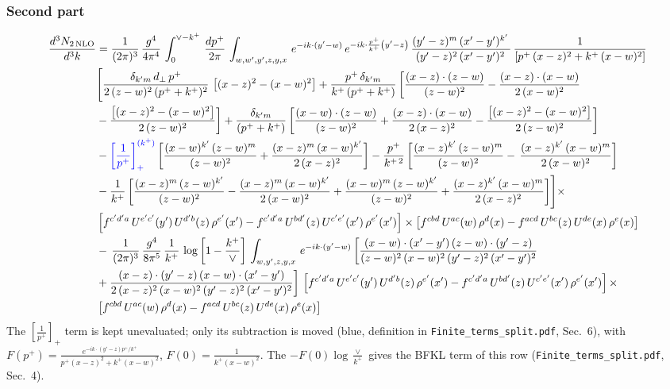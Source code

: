 \documentclass[9pt]{article}
\newcommand{\new}[1]{{\color{blue}#1}}
\numberwithin{equation}{section}
\begin{document}
\subsubsection{Second part}
\begin{align}
 \frac{d^{3}N_{2\,\rm NLO}}{d^{3}k} & = \frac{1}{(2\pi)^{3}}\,\frac{g^{4}}{4\pi^{4}}\,\int_{0}^{\vee-k^{+}}\, \frac{dp^{+}}{2\pi}\,\int_{w,w',y',z,y,x}\, e^{-ik\cdot (y'-w)}\,e^{-ik\cdot \frac{p^{+}}{k^{+}}\left(y'-z\right)}\, \frac{(y'-z)^{m}\,(x'-y')^{k'}\,}{(y'-z)^{2}\,(x'-y')^{2}\,}\, \frac{1}{\left[p^{+}\,(x-z)^{2}+k^{+}\,(x-w)^{2}\right]}\notag \\ & \Bigg[\frac{\delta_{k'm}\,d_{\perp}\,p^{+}}{2\,(z-w)^{2}\,(p^{+}+k^{+})^{2}}\, \left[(x-z)^{2}-(x-w)^{2}\right]+\frac{p^{+}\,\delta_{k'm}}{k^{+}\,(p^{+}+k^{+})}\,\bigg[\frac{(x-z)\cdot (z-w)}{(z-w)^{2}} -\frac{(x-z)\cdot (x-w)}{2\,(x-w)^{2}}\notag \\ & -\frac{\left[(x-z)^{2}-(x-w)^{2}\right]}{2\,(z-w)^{2}}\bigg] +\frac{\delta_{k'm}}{(p^{+}+k^{+})}\,\bigg[\frac{(x-w)\cdot (z-w)}{(z-w)^{2}}+\frac{(x-z)\cdot (x-w)}{2\,(x-z)^{2}} -\frac{\left[(x-z)^{2}-(x-w)^{2}\right]}{2\,(z-w)^{2}}\bigg]\notag \\ & -\new{\left[\frac{1}{p^{+}}\right]_{+}^{(k^{+})}}\,\bigg[\frac{(x-w)^{k'}\,(z-w)^{m}}{(z-w)^{2}}+\frac{(x-z)^{m}\,(x-w)^{k'}}{2\,(x-z)^{2}}\bigg]-\frac{p^{+}}{k^{+\,2}}\,\bigg[\frac{(x-z)^{k'}\,(z-w)^{m}}{(z-w)^{2}} -\,\frac{(x-z)^{k'}\,(x-w)^{m}}{2\,(x-w)^{2}}\bigg]\notag \\ & -\frac{1}{k^{+}}\,\bigg[\frac{(x-z)^{m}\,(z-w)^{k'}}{(z-w)^{2}}-\frac{(x-z)^{m}\,(x-w)^{k'}}{2\,(x-w)^{2}}+\frac{(x-w)^{m}\,(z-w)^{k'}}{(z-w)^{2}} +\frac{(x-z)^{k'}\,(x-w)^{m}}{2\,(x-z)^{2}}\bigg]\Bigg]\times\,\notag \\ & \left[f^{c'd'a}\,U^{e'c'}(y')\,U^{d'b}(z)\,\rho^{e'}(x')-f^{c'd'a}\, 
    U^{bd'}(z)\,U^{c'e'}(x')\,\rho^{e'}(x')\right]\times \left[f^{cbd}\,U^{ac}(w)\,\rho^{d}(x) -f^{acd}\,U^{bc}(z)\,U^{de}(x)\,\rho^{e}(x)\right]\notag \\ &  -\, \frac{1}{(2\pi)^{3}}\,\frac{g^{4}}{8\pi^{5}}\,\frac{1}{k^{+}}\,\log{\left[1-\frac{k^{+}}{\vee}\right]}\,\int_{w,y',z,y,x}\, e^{-ik\cdot (y'-w)}\,\bigg[\frac{(x-w)\cdot (x'-y')\,(z-w)\cdot (y'-z)}{(z-w)^{2}\,(x-w)^{2}\,(y'-z)^{2}\,(x'-y')^{2}}\notag \\ & +\frac{(x-z)\cdot (y'-z)\,(x-w)\cdot (x'-y')}{2\,(x-z)^{2}\,(x-w)^{2}\,(y'-z)^{2}\,(x'-y')^{2}}\bigg]\, \left[f^{c'd'a}\,U^{e'c'}(y')\,U^{d'b}(z)\,\rho^{e'}(x')-f^{c'd'a}\, 
    U^{bd'}(z)\,U^{c'e'}(x')\,\rho^{e'}(x')\right]\times\notag \\ &  \left[f^{cbd}\,U^{ac}(w)\,\rho^{d}(x) -f^{acd}\,U^{bc}(z)\,U^{de}(x)\,\rho^{e}(x)\right] 
\end{align}
\new{The $\left[\frac{1}{p^+}\right]_+$ term is kept unevaluated; only its subtraction is moved (blue, definition in \texttt{Finite\_terms\_split.pdf}, Sec.~6), with $F(p^+)=\frac{e^{-ik\cdot(y'-z)p^+/k^+}}{p^+(x-z)^2+k^+(x-w)^2}$, $F(0)=\frac{1}{k^+(x-w)^2}$. The $-F(0)\log\frac{\vee}{k^+}$ gives the BFKL term of this row (\texttt{Finite\_terms\_split.pdf}, Sec.~4).}
\end{document}
